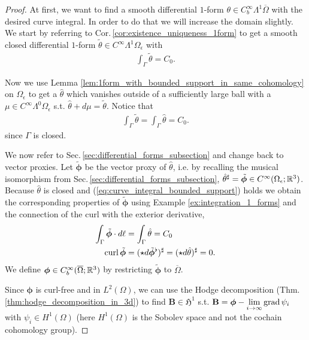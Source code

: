 \documentclass[../master_thesis.tex]{subfiles}
\begin{document}
\begin{proof}
    At first, we want to find a smooth differential $1$-form 
    $\theta \in C_b^\infty\Lambda^1 \overline{\Omega}$ with the desired curve integral. 
    In order to do that we will increase the 
    domain slightly.
    We start by referring to Cor.\,\ref{cor:existence_uniqueness_1form} 
    to get a smooth closed differential $1$-form 
    $\tilde{\theta} \in C^\infty\Lambda^1 \Omega_\epsilon$ with 
    \begin{align}
        \int_\Gamma \tilde{\theta} = C_0. \label{eq:integral_theta_tilde}
    \end{align}

    Now we use Lemma \ref{lem:1form_with_bounded_support_in_same_cohomology} 
    on $\Omega_\epsilon$ to get a $\hat{\theta}$ which vanishes 
    outside of a sufficiently large ball with a $\mu \in C^\infty\Lambda^0 \Omega_\epsilon$ s.t. 
    $\hat{\theta} + d\mu= \tilde{\theta}$. Notice that
    \begin{align}
        \int_\Gamma \tilde{\theta} = \int_\Gamma \hat{\theta} = C_0. \label{eq:curve_integral_bounded_support}
    \end{align}
    since $\Gamma$ is closed. 
    
    We now refer to Sec.\,\ref{sec:differential_forms_subsection} 
    and change back to vector proxies. Let 
    $\tilde{\bm{\phi}}$ be the vector proxy of $\hat{\theta}$, 
    i.e. by recalling the musical isomorphism from Sec.\,\ref{sec:differential_forms_subsection},
    $\hat{\theta}^\sharp = \tilde{\bm{\phi}} \in C^\infty(\Omega_\epsilon;\mathbb{R}^3)$.
    Because $\hat{\theta}$ is closed and (\ref{eq:curve_integral_bounded_support}) holds
    we obtain the corresponding properties 
    of $\tilde{\bm{\phi}}$ using Example \ref{ex:integration_1_forms} and the connection 
    of the curl with the exterior derivative,
    \begin{align*}
        \int_\Gamma \tilde{\bm{\phi}} \cdot d\ell &= \int_\Gamma \hat{\theta} = C_0 
        \\ \operatorname{curl} \tilde{\bm{\phi}} &= (\star d\tilde{\bm{\phi}}^\flat)^\sharp = 
        (\star d\hat{\theta})^\sharp = 0.
    \end{align*}
    We define $\bm{\phi} \in C_b^\infty(\overline{\Omega};\mathbb{R}^3)$ by restricting $\tilde{\bm{\phi}}$ 
    to $\overline{\Omega}$. 

    Since $\bm{\phi}$ is curl-free and in $L^2(\Omega)$, we can use the Hodge decomposition 
    (Thm. \ref{thm:hodge_decomposition_in_3d}) to find $\mathbf{B} \in \mathfrak{H}^1$ s.t.
    $\mathbf{B} = \bm{\phi} - \lim\limits_{i\rightarrow \infty}\operatorname{grad} \psi_i$ 
    with $\psi_i \in H^1(\Omega)$ (here $H^1(\Omega)$ is the Sobolev space and not the cochain 
    cohomology group).


\end{proof}
\end{document}
